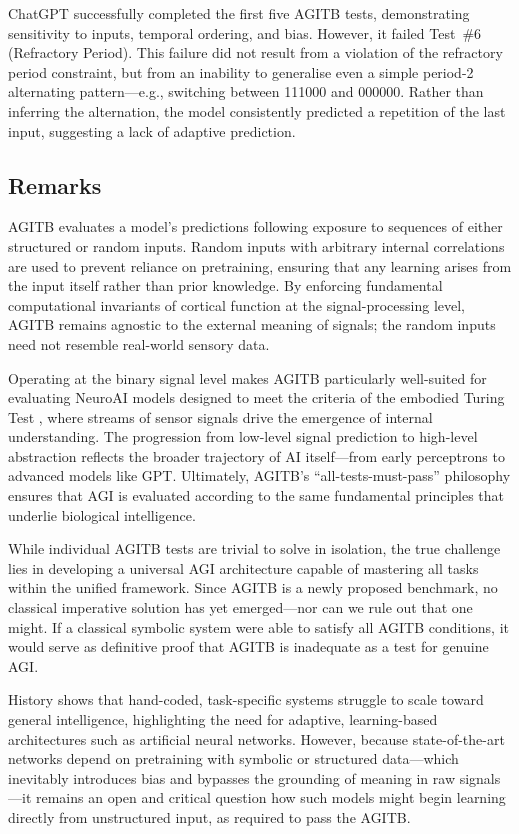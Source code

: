 \documentclass{article}
\begin{document}
ChatGPT successfully completed the first five AGITB tests, demonstrating sensitivity to inputs, temporal ordering, and bias. However, it failed Test~\#6 (Refractory Period). This failure did not result from a violation of the refractory period constraint, but from an inability to generalise even a simple period-2 alternating pattern—e.g., switching between 111000 and 000000. Rather than inferring the alternation, the model consistently predicted a repetition of the last input, suggesting a lack of adaptive prediction.



\subsection{Remarks}

AGITB evaluates a model’s predictions following exposure to sequences of either structured or random inputs. Random inputs with arbitrary internal correlations are used to prevent reliance on pretraining, ensuring that any learning arises from the input itself rather than prior knowledge. By enforcing fundamental computational invariants of cortical function at the signal-processing level, AGITB remains agnostic to the external meaning of signals; the random inputs need not resemble real-world sensory data.

Operating at the binary signal level makes AGITB particularly well-suited for evaluating NeuroAI models designed to meet the criteria of the embodied Turing Test \cite{Zador2023}, where streams of sensor signals drive the emergence of internal understanding. The progression from low-level signal prediction to high-level abstraction reflects the broader trajectory of AI itself—from early perceptrons to advanced models like GPT. Ultimately, AGITB’s “all-tests-must-pass” philosophy ensures that AGI is evaluated according to the same fundamental principles that underlie biological intelligence.

While individual AGITB tests are trivial to solve in isolation, the true challenge lies in developing a universal AGI architecture capable of mastering all tasks within the unified framework. Since AGITB is a newly proposed benchmark, no classical imperative solution has yet emerged—nor can we rule out that one might. If a classical symbolic system were able to satisfy all AGITB conditions, it would serve as definitive proof that AGITB is inadequate as a test for genuine AGI.

History shows that hand-coded, task-specific systems struggle to scale toward general intelligence, highlighting the need for adaptive, learning-based architectures such as artificial neural networks. However, because state-of-the-art networks depend on pretraining with symbolic or structured data—which inevitably introduces bias and bypasses the grounding of meaning in raw signals—it remains an open and critical question how such models might begin learning directly from unstructured input, as required to pass the AGITB.
\end{document}
